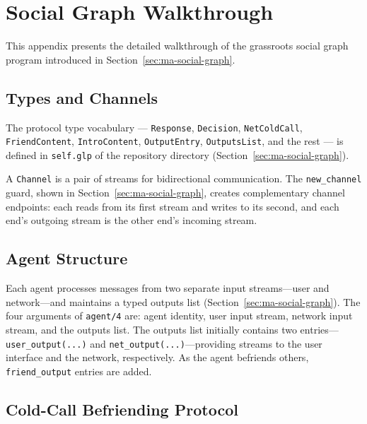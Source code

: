 \section{Social Graph Walkthrough}\label{appendix:social-graph-walkthrough}

This appendix presents the detailed walkthrough of the grassroots social graph program introduced in Section~\ref{sec:ma-social-graph}.

\subsection{Types and Channels}

The protocol type vocabulary --- \verb|Response|, \verb|Decision|, \verb|NetColdCall|, \verb|FriendContent|, \verb|IntroContent|, \verb|OutputEntry|, \verb|OutputsList|, and the rest --- is defined in \verb|self.glp| of the repository directory (Section~\ref{sec:ma-social-graph}).

A \verb|Channel| is a pair of streams for bidirectional communication. The \verb|new_channel| guard, shown in Section~\ref{sec:ma-social-graph}, creates complementary channel endpoints: each reads from its first stream and writes to its second, and each end's outgoing stream is the other end's incoming stream.

\subsection{Agent Structure}

Each agent processes messages from two separate input streams---user and network---and maintains a typed outputs list (Section~\ref{sec:ma-social-graph}). The four arguments of \verb|agent/4| are: agent identity, user input stream, network input stream, and the outputs list. The outputs list initially contains two entries---\verb|user_output(...)| and \verb|net_output(...)|---providing streams to the user interface and the network, respectively. As the agent befriends others, \verb|friend_output| entries are added.

\subsection{Cold-Call Befriending Protocol}

